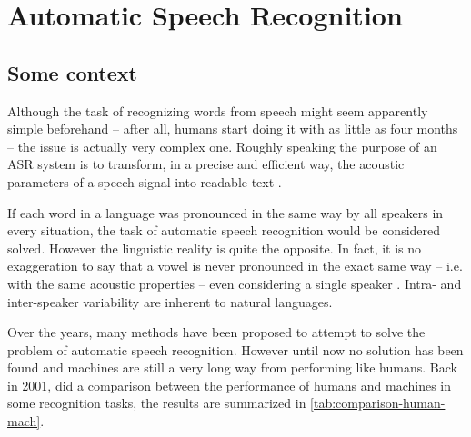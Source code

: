 \clearpage
\section{Automatic Speech Recognition}\label{sec:speech-recognition}

\subsection{Some context}

Although the task of recognizing words from speech might seem apparently simple beforehand -- after all, humans start doing it with as little as four months -- the issue is actually very complex one. Roughly speaking the purpose of an \ac{ASR} system is to transform, in a precise and efficient way, the acoustic parameters of a speech signal into readable text \cite{Rabiner2007}.

If each word in a language was pronounced in the same way by all speakers in every situation, the task of automatic speech recognition would be considered solved. However the linguistic reality is quite the opposite. In fact, it is no exaggeration to say that a vowel is never pronounced in the exact same way -- i.e. with the same acoustic properties -- even considering a single speaker \cite{Johnson2004}. Intra- and inter-speaker variability are inherent to natural languages.

Over the years, many methods have been 
proposed to attempt to solve the problem of automatic speech recognition. 
However until now no solution has been found and machines are still
a very long way from performing like humans. Back in 2001, \citep{Huang2001} did a comparison between the performance of humans and machines in some recognition tasks, the results are summarized in \autoref{tab:comparison-human-mach}.

